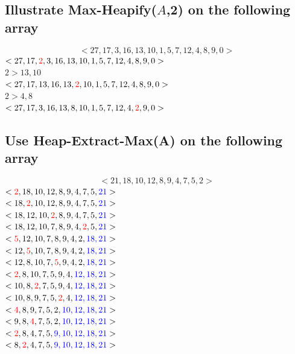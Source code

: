 \documentclass[12pt, a4paper]{article}
\begin{document}
			\subsection{Illustrate Max-Heapify($A$,2) on the following array}
				$$<27,17,3,16,13,10,1,5,7,12,4,8,9,0>$$
				$<27,17,\color{red}2\color{black},3,16,13,10,1,5,7,12,4,8,9,0>$\\
				$2 > 13, 10$\\
				$<27,17,13,16,13,\color{red}2\color{black},10,1,5,7,12,4,8,9,0>$\\
				$2 > 4, 8$\\
				$<27,17,3,16,13,8,10,1,5,7,12,4,\color{red}2\color{black},9,0>$\\
			\subsection{Use Heap-Extract-Max(A) on the following array}
				$$<21,18,10,12,8,9,4,7,5,2>$$
				$<\color{red}2\color{black},18,10,12,8,9,4,7,5,\color{blue}21\color{black}>$\\
				$<18,\color{red}2\color{black},10,12,8,9,4,7,5,\color{blue}21\color{black}>$\\
				$<18,12,10,\color{red}2\color{black},8,9,4,7,5,\color{blue}21\color{black}>$\\
				$<18,12,10,7,8,9,4,\color{red}2\color{black},5,\color{blue}21\color{black}>$\\
				$<\color{red}5\color{black},12,10,7,8,9,4,2,\color{blue}18,21\color{black}>$\\
				$<12,\color{red}5\color{black},10,7,8,9,4,2,\color{blue}18,21\color{black}>$\\
				$<12,8,10,7,\color{red}5\color{black},9,4,2,\color{blue}18,21\color{black}>$\\
				$<\color{red}2\color{black},8,10,7,5,9,4,\color{blue}12,18,21\color{black}>$\\
				$<10,8,\color{red}2\color{black},7,5,9,4,\color{blue}12,18,21\color{black}>$\\
				$<10,8,9,7,5,\color{red}2\color{black},4,\color{blue}12,18,21\color{black}>$\\
				$<\color{red}4\color{black},8,9,7,5,2,\color{blue}10,12,18,21\color{black}>$\\
				$<9,8,\color{red}4\color{black},7,5,2,\color{blue}10,12,18,21\color{black}>$\\
				$<\color{red}2\color{black},8,4,7,5,\color{blue}9,10,12,18,21\color{black}>$\\
				$<8,\color{red}2\color{black},4,7,5,\color{blue}9,10,12,18,21\color{black}>$\\
\end{document}
